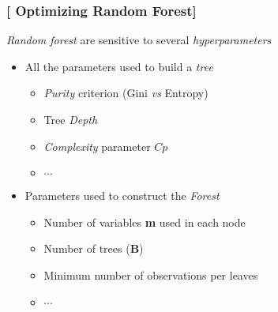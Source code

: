 \documentclass[xcolor=x11names,compress, aspectratio=169]{beamer}
\renewcommand{\(}{\begin{columns}}
\renewcommand{\)}{\end{columns}}
\newcommand{\<}[1]{\begin{column}{#1}}
\renewcommand{\>}{\end{column}}
\begin{document}
\begin{frame}
\frametitle{\textcolor{brique}{[ Optimizing Random Forest]}}
\textit{Random forest} are sensitive to several \textit{hyperparameters}
\pause
\begin{itemize}[<+->]
    \item All the parameters used to build a \textit{tree}
    \begin{itemize}[<+->]
        \item \textit{Purity} criterion (Gini \textit{vs} Entropy)
        \item Tree \textit{Depth}
        \item \textit{Complexity} parameter $Cp$
        \item $\cdots$
    \end{itemize}
    \item Parameters used to construct the \textit{Forest}
    \begin{itemize}[<+->]
        \item Number of variables \textbf{m} used in each node
        \item Number of trees (\textbf{B})
        \item Minimum number of observations per leaves
        \item $\cdots$
    \end{itemize}
\end{itemize}
\end{frame}


\end{document}
